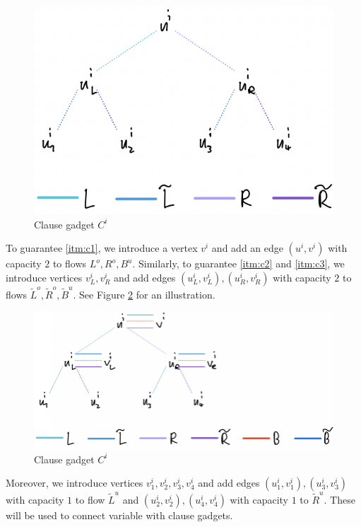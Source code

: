 \documentclass[fontsize=11pt,paper=a4]{book}
\begin{document}
\begin{figure}[htbp]
\centering
\includegraphics[width=.9\linewidth]{../assets/Screen Shot 2023-05-27 at 14.31.00.png}
\caption{\label{fig:org0ab5d84}Clause gadget \(C^i\)}
\end{figure}

To guarantee \ref{itm:c1}, we introduce a vertex \(v^i\) and add an edge \((u^i,v^i)\) with capacity \(2\) to flows \(L^o,R^o,B^u\).
Similarly, to guarantee \ref{itm:c2} and \ref{itm:c3}, we introduce vertices \(v_L^i,v_R^i\) and add edges \((u_L^i,v_L^i),(u_R^i,v_R^i)\) with capacity \(2\) to flows \(\tilde{L}^o,\tilde{R}^o,\tilde{B}^u\).
See Figure \ref{fig:org746f116} for an illustration.

\begin{figure}[htbp]
\centering
\includegraphics[width=.9\linewidth]{../assets/Screen Shot 2023-05-27 at 14.31.31.png}
\caption{\label{fig:org746f116}Clause gadget \(C^i\)}
\end{figure}

Moreover, we introduce vertices \(v_1^i,v_2^i,v_3^i,v_4^i\) and add edges \((u_1^i,v_1^i),(u_3^i,v_3^i)\) with capacity \(1\) to flow \(\tilde{L}^u\) and \((u_2^i,v_2^i),(u_4^i,v_4^i)\) with capacity \(1\) to \(\tilde{R}^u\).
These will be used to connect variable with clause gadgets.
\end{document}
